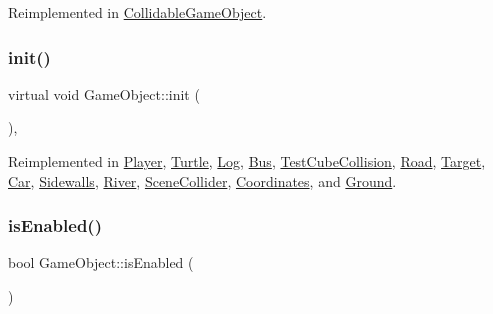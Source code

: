 Reimplemented in \hyperlink{class_collidable_game_object_a9890003d579d6318a4da31a0d540ab2f}{Collidable\+Game\+Object}.

\mbox{\label{class_game_object_aecb2c1b9f69715d854f7604d5d7978ec}} 
\subsubsection{\texorpdfstring{init()}{init()}}
{\footnotesize\ttfamily virtual void Game\+Object\+::init (\begin{DoxyParamCaption}{ }\end{DoxyParamCaption})\hspace{0.3cm}{\ttfamily [inline]}, {\ttfamily [virtual]}}



Reimplemented in \hyperlink{class_player_a1fb512423a77eee4ed0dea7cb7179c83}{Player}, \hyperlink{class_turtle_a6ba4b31af71ea52e0e885a3e3beb783c}{Turtle}, \hyperlink{class_log_aa6d8efc1a2ca7c84945bd129fe92448f}{Log}, \hyperlink{class_bus_a7bff316b767441b92f8e82f17a44fbf7}{Bus}, \hyperlink{class_test_cube_collision_a22fade1ca48a2cd49dd4ca6cbc93821b}{Test\+Cube\+Collision}, \hyperlink{class_road_a2d72b47fce205751e504929e91a7e567}{Road}, \hyperlink{class_target_aca691803b6bb7185adc521d63cdd7835}{Target}, \hyperlink{class_car_ae7d4da15bf41cc2d36465129372f2a71}{Car}, \hyperlink{class_sidewalls_a4d6161bfb13fe2779a9510c424879707}{Sidewalls}, \hyperlink{class_river_a34d39d986e411f957e77e85ba5719af4}{River}, \hyperlink{class_scene_collider_a2b2aae1d24b6f40188150d3002e00218}{Scene\+Collider}, \hyperlink{class_coordinates_aaadf934b8f184a9e0abe504e4c2da9b1}{Coordinates}, and \hyperlink{class_ground_a4680c2a6ab91627a71939a5a942409ac}{Ground}.

\mbox{\label{class_game_object_afd4da74521b2ba311f82b62f6ffec9e3}} 
\subsubsection{\texorpdfstring{is\+Enabled()}{isEnabled()}}
{\footnotesize\ttfamily bool Game\+Object\+::is\+Enabled (\begin{DoxyParamCaption}{ }\end{DoxyParamCaption})\hspace{0.3cm}{\ttfamily [inline]}}

